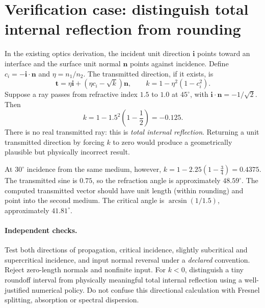 \clearpage
\section*{Verification case: distinguish total internal reflection from rounding}
\noindent In the existing optics derivation, the incident unit direction
\(\mathbf i\) points toward an interface and the surface unit normal
\(\mathbf n\) points against incidence. Define
\(c_i=-\mathbf i\cdot\mathbf n\) and \(\eta=n_1/n_2\).
The transmitted direction, if it exists, is
\[
\mathbf t=\eta\mathbf i+(\eta c_i-\sqrt{k})\mathbf n,
\qquad k=1-\eta^2(1-c_i^2).
\]
Suppose a ray passes from refractive index \(1.5\) to \(1.0\)
at \(45^\circ\), with \(\mathbf i\cdot\mathbf n=-1/\sqrt2\).
Then
\[
k=1-1.5^2\left(1-\frac12\right)=-0.125.
\]
There is no real transmitted ray: this is \emph{total internal
reflection}. Returning a unit transmitted direction by forcing
\(k\) to zero would produce a geometrically plausible but
physically incorrect result.

At \(30^\circ\) incidence from the same medium, however,
\(k=1-2.25(1-\tfrac34)=0.4375\).
The transmitted sine is \(0.75\), so the refraction angle is
approximately \(48.59^\circ\). The computed transmitted vector
should have unit length (within rounding) and point into the
second medium. The critical angle is
\(\arcsin(1/1.5)\), approximately \(41.81^\circ\).

\paragraph{Independent checks.}
Test both directions of propagation, critical incidence, slightly
subcritical and supercritical incidence, and input normal reversal
under a \emph{declared} convention. Reject zero-length normals and
nonfinite input. For \(k<0\), distinguish a tiny roundoff interval
from physically meaningful total internal reflection using a
well-justified numerical policy. Do not confuse this directional
calculation with Fresnel splitting, absorption or spectral dispersion.
